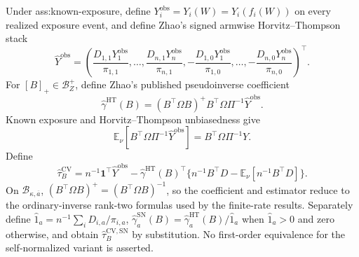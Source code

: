Under ass:known-exposure, define \(Y_i^{\mathrm{obs}}=Y_i(W)=Y_i(f_i(W))\) on every realized exposure event, and define Zhao's signed armwise Horvitz--Thompson stack
\[
\widehat Y^{\mathrm{obs}}=
\left(\frac{D_{1,1}Y_1^{\mathrm{obs}}}{\pi_{1,1}},\ldots,
\frac{D_{n,1}Y_n^{\mathrm{obs}}}{\pi_{n,1}},
-\frac{D_{1,0}Y_1^{\mathrm{obs}}}{\pi_{1,0}},\ldots,
-\frac{D_{n,0}Y_n^{\mathrm{obs}}}{\pi_{n,0}}\right)^{\top}.
\]
For \([B]_+\in\mathcal B_Z^+\), define Zhao's published pseudoinverse coefficient
\[
\widehat\gamma^{\mathrm{HT}}(B)
=(B^{\top}\Omega B)^+B^{\top}\Omega\Pi^{-1}\widehat Y^{\mathrm{obs}}.
\]
Known exposure and Horvitz--Thompson unbiasedness give
\[
\mathbb E_\nu[B^{\top}\Omega\Pi^{-1}\widehat Y^{\mathrm{obs}}]
=B^{\top}\Omega\Pi^{-1}Y.
\]
Define
\[
\widehat\tau_B^{\mathrm{CV}}
=n^{-1}\mathbf1^{\top}\widehat Y^{\mathrm{obs}}
-\widehat\gamma^{\mathrm{HT}}(B)^{\top}
\{n^{-1}B^{\top}D-\mathbb E_\nu[n^{-1}B^{\top}D]\}.
\]
On \(\mathcal B_{\kappa,\overline a}\), \((B^{\top}\Omega B)^+=(B^{\top}\Omega B)^{-1}\), so the coefficient and estimator reduce to the ordinary-inverse rank-two formulas used by the finite-rate results.  Separately define \(\widehat1_a=n^{-1}\sum_iD_{i,a}/\pi_{i,a}\), \(\widehat\gamma_a^{\mathrm{SN}}(B)=\widehat\gamma_a^{\mathrm{HT}}(B)/\widehat1_a\) when \(\widehat1_a>0\) and zero otherwise, and obtain \(\widehat\tau_B^{\mathrm{CV,SN}}\) by substitution.  No first-order equivalence for the self-normalized variant is asserted.